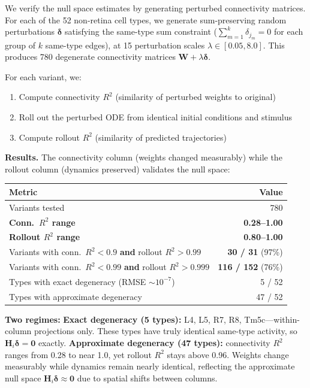 \documentclass[11pt,a4paper]{article}
\begin{document}
We verify the null space estimates by generating perturbed connectivity matrices. For each of the 52 non-retina cell types, we generate sum-preserving random perturbations $\boldsymbol{\delta}$ satisfying the same-type sum constraint ($\sum_{m=1}^{k} \delta_{j_m} = 0$ for each group of $k$ same-type edges), at 15 perturbation scales $\lambda \in [0.05, 8.0]$. This produces 780 degenerate connectivity matrices $\mathbf{W} + \lambda\boldsymbol{\delta}$.

For each variant, we:
\begin{enumerate}[nosep]
\item Compute connectivity $R^2$ (similarity of perturbed weights to original)
\item Roll out the perturbed ODE from identical initial conditions and stimulus
\item Compute rollout $R^2$ (similarity of predicted trajectories)
\end{enumerate}

\noindent\textbf{Results.} The connectivity column (weights changed measurably) while the rollout column (dynamics preserved) validates the null space:

\begin{center}
\begin{tabular}{lr}
\toprule
Metric & Value \\
\midrule
Variants tested & 780 \\
\textbf{Conn.\ $R^2$ range} & \textbf{0.28--1.00} \\
\textbf{Rollout $R^2$ range} & \textbf{0.80--1.00} \\
Variants with conn.\ $R^2 < 0.9$ \textbf{and} rollout $R^2 > 0.99$ & \textbf{30 / 31} (97\%) \\
Variants with conn.\ $R^2 < 0.99$ \textbf{and} rollout $R^2 > 0.999$ & \textbf{116 / 152} (76\%) \\
Types with exact degeneracy (RMSE $\sim 10^{-7}$) & 5 / 52 \\
Types with approximate degeneracy & 47 / 52 \\
\bottomrule
\end{tabular}
\end{center}

\noindent\textbf{Two regimes:} \textbf{Exact degeneracy (5 types):} L4, L5, R7, R8, Tm5c---within-column projections only. These types have truly identical same-type activity, so $\mathbf{H}_i\boldsymbol{\delta} = \mathbf{0}$ exactly. \textbf{Approximate degeneracy (47 types):} connectivity $R^2$ ranges from 0.28 to near 1.0, yet rollout $R^2$ stays above 0.96. Weights change measurably while dynamics remain nearly identical, reflecting the approximate null space $\mathbf{H}_i\boldsymbol{\delta} \approx \mathbf{0}$ due to spatial shifts between columns.
\end{document}
